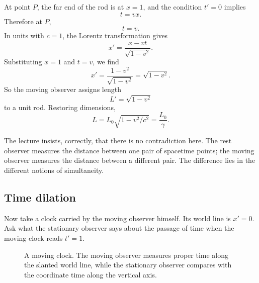 At point \(P\), the far end of the rod is at \(x=1\), and the condition \(t'=0\) implies
\begin{equation}
t=vx.
\end{equation}
Therefore at \(P\),
\begin{equation}
t=v.
\end{equation}
In units with \(c=1\), the Lorentz transformation gives
\begin{equation}
x'=\frac{x-vt}{\sqrt{1-v^2}}.
\end{equation}
Substituting \(x=1\) and \(t=v\), we find
\begin{equation}
x'=\frac{1-v^2}{\sqrt{1-v^2}}=\sqrt{1-v^2}.
\end{equation}
So the moving observer assigns length
\begin{equation}
L'=\sqrt{1-v^2}
\end{equation}
to a unit rod. Restoring dimensions,
\begin{equation}
L=L_0\sqrt{1-v^2/c^2}=\frac{L_0}{\gamma}.
\end{equation}

The lecture insists, correctly, that there is no contradiction here. The rest observer measures the distance between one pair of spacetime points; the moving observer measures the distance between a different pair. The difference lies in the different notions of simultaneity.

\subsection{Time dilation}

Now take a clock carried by the moving observer himself. Its world line is \(x'=0\). Ask what the stationary observer says about the passage of time when the moving clock reads \(t'=1\).

\begin{figure}
\centering
{}
\caption{A moving clock. The moving observer measures proper time along the slanted world line, while the stationary observer compares with the coordinate time along the vertical axis.}
\end{figure}

